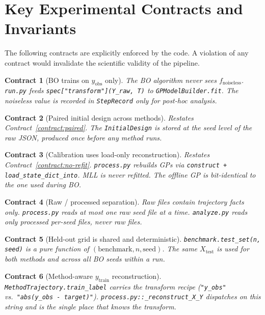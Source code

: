 \documentclass[11pt]{article}
\newtheorem{contract}{Contract}
\begin{document}
\section{Key Experimental Contracts and Invariants}
\label{sec:contracts}
 
The following contracts are explicitly enforced by the code.
A violation of any contract would invalidate the scientific validity of the pipeline.
 
\begin{contract}[BO trains on $y_{\mathrm{obs}}$ only]
The BO algorithm never sees $f_{\mathrm{noiseless}}$.
\texttt{run.py} feeds \texttt{spec["transform"](Y\_raw, T)} to
\texttt{GPModelBuilder.fit}.
The noiseless value is recorded in \texttt{StepRecord} only for post-hoc analysis.
\end{contract}
 
\begin{contract}[Paired initial design across methods]
\label{contract:paired-ref}
Restates Contract~\ref{contract:paired}.
The \texttt{InitialDesign} is stored at the seed level of the raw JSON, produced once
before any method runs.
\end{contract}
 
\begin{contract}[Calibration uses load-only reconstruction]
Restates Contract~\ref{contract:no-refit}.
\texttt{process.py} rebuilds GPs via \texttt{construct + load\_state\_dict\_into}.
MLL is never refitted. The offline GP is bit-identical to the one used during BO.
\end{contract}
 
\begin{contract}[Raw / processed separation]
Raw files contain trajectory facts only.
\texttt{process.py} reads at most one raw seed file at a time.
\texttt{analyze.py} reads only processed per-seed files, never raw files.
\end{contract}
 
\begin{contract}[Held-out grid is shared and deterministic]
\texttt{benchmark.test\_set(n, seed)} is a pure function of $(\text{benchmark}, n,
\text{seed})$.
The same $X_{\mathrm{test}}$ is used for both methods and across all BO seeds within
a run.
\end{contract}
 
\begin{contract}[Method-aware $y_{\mathrm{train}}$ reconstruction]
\texttt{MethodTrajectory.train\_label} carries the transform recipe
(\texttt{"y\_obs"} vs.\ \texttt{"abs(y\_obs - target)"}).
\texttt{process.py::\_reconstruct\_X\_Y} dispatches on this string and is the single
place that knows the transform.
\end{contract}
 
\end{document}
